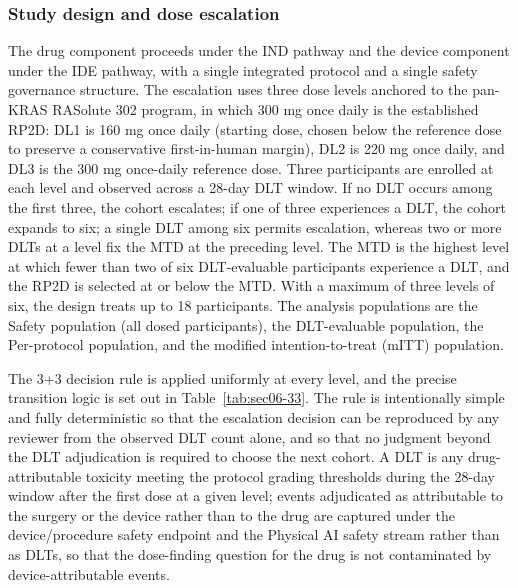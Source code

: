 \subsubsection*{Study design and dose escalation}

The drug component proceeds under the IND pathway and the device component under
the IDE pathway, with a single integrated protocol and a single safety governance
structure. The escalation uses three dose levels anchored to the pan-KRAS RASolute
302 program, in which 300 mg once daily is the established RP2D: DL1 is 160 mg once
daily (starting dose, chosen below the reference dose to preserve a conservative
first-in-human margin), DL2 is 220 mg once daily, and DL3 is the 300 mg once-daily
reference dose. Three participants are enrolled at each level and observed across a
28-day DLT window. If no DLT occurs among the first three, the cohort escalates; if
one of three experiences a DLT, the cohort expands to six; a single DLT among six
permits escalation, whereas two or more DLTs at a level fix the MTD at the
preceding level. The MTD is the highest level at which fewer than two of six
DLT-evaluable participants experience a DLT, and the RP2D is selected at or below
the MTD. With a maximum of three levels of six, the design treats up to 18
participants. The analysis populations are the Safety population (all dosed
participants), the DLT-evaluable population, the Per-protocol population, and the
modified intention-to-treat (mITT) population.

The 3+3 decision rule is applied uniformly at every level, and the precise transition
logic is set out in Table~\ref{tab:sec06-33}. The rule is intentionally simple and
fully deterministic so that the escalation decision can be reproduced by any reviewer
from the observed DLT count alone, and so that no judgment beyond the DLT
adjudication is required to choose the next cohort. A DLT is any drug-attributable
toxicity meeting the protocol grading thresholds during the 28-day window after the
first dose at a given level; events adjudicated as attributable to the surgery or the
device rather than to the drug are captured under the device/procedure safety endpoint
and the Physical AI safety stream rather than as DLTs, so that the dose-finding
question for the drug is not contaminated by device-attributable events.

